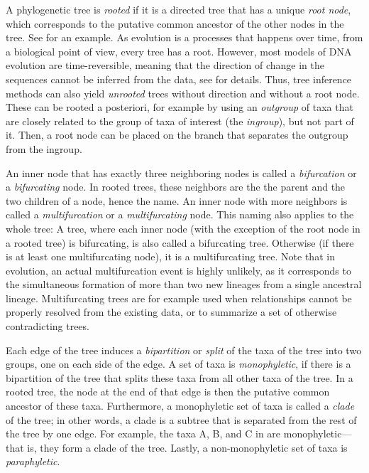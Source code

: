 A phylogenetic tree is \emph{rooted}
if it is a directed tree that has a unique \emph{root node},
which corresponds to the putative common ancestor of the other nodes in the tree.
See  for an example.
As evolution is a processes that happens over time,
from a biological point of view, every tree has a root.
However, most models of DNA evolution are time-reversible,
meaning that the direction of change in the sequences cannot be inferred from the data,
see  for details.
Thus, tree inference methods can also yield \emph{unrooted} trees without direction and without a root node.
These can be rooted a posteriori, for example by using an \emph{outgroup} of taxa
that are closely related to the group of taxa of interest (the \emph{ingroup}), but not part of it.
Then, a root node can be placed on the branch that separates the outgroup from the ingroup.

An inner node that has exactly three neighboring nodes is called a \emph{bifurcation} or a \emph{bifurcating} node.
In rooted trees, these neighbors are the the parent and the two children of a node, hence the name.
An inner node with more neighbors is called a \emph{multifurcation} or a \emph{multifurcating} node.
This naming also applies to the whole tree:
A tree, where each inner node (with the exception of the root node in a rooted tree) is bifurcating,
is also called a bifurcating tree.
Otherwise (if there is at least one multifurcating node), it is a multifurcating tree.
Note that in evolution, an actual multifurcation event is highly unlikely,
as it corresponds to the simultaneous formation of more than two new lineages from a single ancestral lineage.
Multifurcating trees are for example used when relationships cannot be properly resolved from the existing data,
or to summarize a set of otherwise contradicting trees.

Each edge of the tree induces a \emph{bipartition} or \emph{split} of the taxa of the tree into two groups,
one on each side of the edge.
A set of taxa is \emph{monophyletic},
if there is a bipartition of the tree that splits these taxa from all other taxa of the tree.
In a rooted tree, the node at the end of that edge is then the putative common ancestor of these taxa.
Furthermore, a monophyletic set of taxa is called a \emph{clade} of the tree;
in other words, a clade is a subtree that is separated from the rest of the tree by one edge.
For example, the taxa {\sffamily A}, {\sffamily B}, and {\sffamily C} in  are monophyletic---%
that is, they form a clade of the tree.
Lastly, a non-monophyletic set of taxa is \emph{paraphyletic}.

